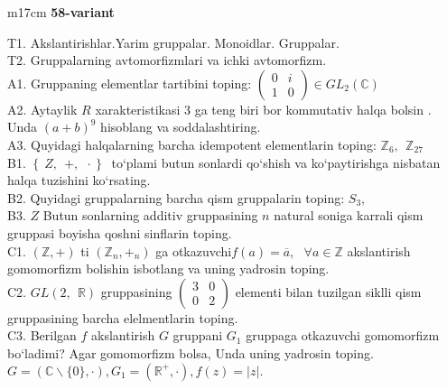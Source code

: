 \documentclass{article}
\begin{document}
\begin{tabular}{m{17cm}}
\textbf{58-variant}
\newline

T1. Akslantirishlar.Yarim gruppalar. Monoidlar. Gruppalar. \\
T2. Gruppalarning avtomorfizmlari va ichki avtomorfizm. \\
A1. Gruppaning elementlar tartibini toping: \(\begin{pmatrix}
0 & i \\
1 & 0
\end{pmatrix} \in GL_{2}(\mathbb{C})\) \\
A2. Aytaylik \(R\) xarakteristikasi 3 ga teng biri bor kommutativ halqa bo\textquotesingle lsin . Unda \((a + b)^{9}\) hisoblang va soddalashtiring. \\
A3. Quyidagi halqalarning barcha idempotent elementlarin toping: \(\mathbb{Z}_{6},\ \ \mathbb{Z}_{27}\) \\
B1. \(\left\{ \left. \ Z,\ \  + ,\ \  \cdot \right\} \right.\ \) to`plami butun sonlardi qo`shish va ko`paytirishga nisbatan halqa tuzishini ko`rsating. \\
B2. Quyidagi gruppalarning barcha qism gruppalarin toping: \(S_{3},\) \\
B3. \(Z\) Butun sonlarning additiv gruppasining \(n\) natural soniga karrali qism gruppasi boyisha qo\textquotesingle shni sinflarin toping. \\
C1. \(\left( \mathbb{Z}, + \right)\) ti \(\left( \mathbb{Z}_{n}, +_{n} \right)\) ga o\textquotesingle tkazuvchi\(f(a) = \overline{a},\ \ \ \forall a\mathbb{\in Z}\) akslantirish gomomorfizm bolishin isbotlang va uning yadrosin toping. \\
C2. \(GL(2,\mathbb{\ \ R})\) gruppasining \(\begin{pmatrix}
3 & 0 \\
0 & 2
\end{pmatrix}\) elementi bilan tuzilgan siklli qism gruppasining barcha elelmentlarin toping. \\
C3. Berilgan \(f\) akslantirish \(G\) gruppani \(G_{1}\) gruppaga o\textquotesingle tkazuvchi gomomorfizm bo`ladimi? Agar gomomorfizm bolsa, Unda uning yadrosin toping.\(G = (\mathbb{C}\backslash\{ 0\}, \cdot ),G_{1} = \left( \mathbb{R}^{+}, \cdot \right),f(z) = |z|.\) \\

\end{tabular}
\vspace{1cm}
\end{document}
